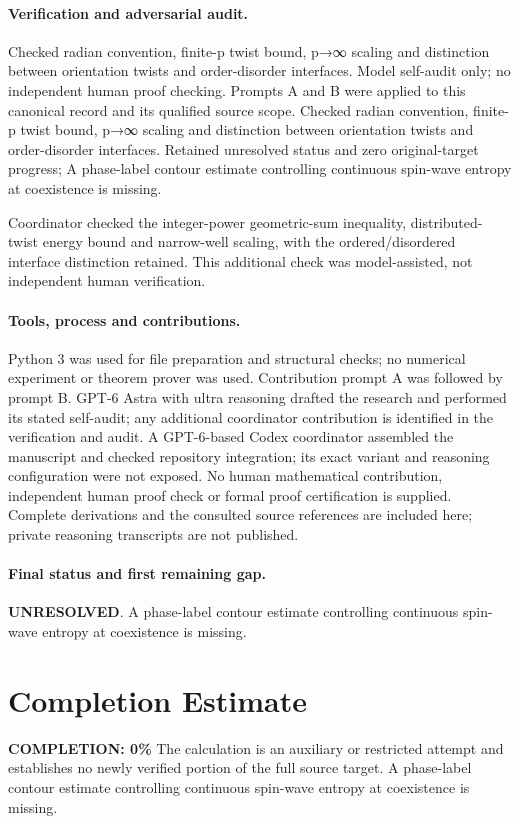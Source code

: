 \documentclass[11pt]{article}
\begin{document}
\paragraph{Verification and adversarial audit.}
Checked radian convention, finite-p twist bound, p→∞ scaling and distinction between orientation twists and order-disorder interfaces. Model self-audit only; no independent human proof checking. Prompts A and B were applied to this canonical record and its qualified source scope. Checked radian convention, finite-p twist bound, p→∞ scaling and distinction between orientation twists and order-disorder interfaces. Retained unresolved status and zero original-target progress; A phase-label contour estimate controlling continuous spin-wave entropy at coexistence is missing.

Coordinator checked the integer-power geometric-sum inequality, distributed-twist energy bound and narrow-well scaling, with the ordered/disordered interface distinction retained. This additional check was model-assisted, not independent human verification.

\paragraph{Tools, process and contributions.}
Python 3 was used for file preparation and structural checks; no numerical experiment or theorem prover was used. Contribution prompt A was followed by prompt B. GPT-6 Astra with ultra reasoning drafted the research and performed its stated self-audit; any additional coordinator contribution is identified in the verification and audit. A GPT-6-based Codex coordinator assembled the manuscript and checked repository integration; its exact variant and reasoning configuration were not exposed. No human mathematical contribution, independent human proof check or formal proof certification is supplied. Complete derivations and the consulted source references are included here; private reasoning transcripts are not published.

\paragraph{Final status and first remaining gap.}
\textbf{UNRESOLVED}. A phase-label contour estimate controlling continuous spin-wave entropy at coexistence is missing.

\section{Completion Estimate}
\noindent\textbf{COMPLETION: 0\%}
The calculation is an auxiliary or restricted attempt and establishes no newly verified portion of the full source target. A phase-label contour estimate controlling continuous spin-wave entropy at coexistence is missing.
\end{document}
